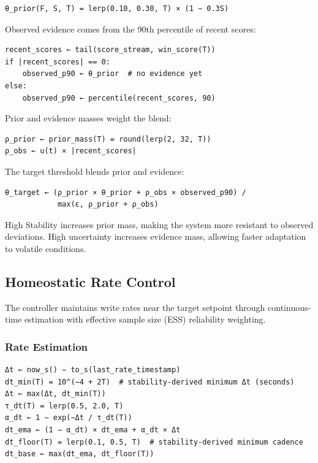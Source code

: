 \documentclass[
  letterpaper,
  DIV=11,
  numbers=noendperiod]{scrartcl}
\begin{document}
\begin{verbatim}
θ_prior(F, S, T) = lerp(0.10, 0.30, T) × (1 − 0.3S)
\end{verbatim}

Observed evidence comes from the 90th percentile of recent scores:

\begin{verbatim}
recent_scores ← tail(score_stream, win_score(T))
if |recent_scores| == 0:
    observed_p90 ← θ_prior  # no evidence yet
else:
    observed_p90 ← percentile(recent_scores, 90)
\end{verbatim}

Prior and evidence masses weight the blend:

\begin{verbatim}
ρ_prior ← prior_mass(T) = round(lerp(2, 32, T))
ρ_obs ← u(t) × |recent_scores|
\end{verbatim}

The target threshold blends prior and evidence:

\begin{verbatim}
θ_target ← (ρ_prior × θ_prior + ρ_obs × observed_p90) /
            max(ε, ρ_prior + ρ_obs)
\end{verbatim}

High Stability increases prior mass, making the system more resistant to
observed deviations. High uncertainty increases evidence mass, allowing
faster adaptation to volatile conditions.

\subsection{Homeostatic Rate Control}\label{homeostatic-rate-control}

The controller maintains write rates near the target setpoint through
continuous-time estimation with effective sample size (ESS) reliability
weighting.

\subsubsection{Rate Estimation}\label{rate-estimation}

\begin{verbatim}
Δt ← now_s() − to_s(last_rate_timestamp)
dt_min(T) = 10^(−4 + 2T)  # stability-derived minimum Δt (seconds)
Δt ← max(Δt, dt_min(T))
τ_dt(T) = lerp(0.5, 2.0, T)
α_dt ← 1 − exp(−Δt / τ_dt(T))
dt_ema ← (1 − α_dt) × dt_ema + α_dt × Δt
dt_floor(T) = lerp(0.1, 0.5, T)  # stability-derived minimum cadence
dt_base ← max(dt_ema, dt_floor(T))
\end{verbatim}
\end{document}
